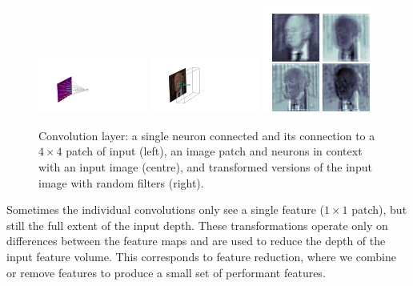\begin{figure}[h!]
    \begin{center}
        \includegraphics[width=0.32\textwidth]{figures/machine_learning/convolution_neuron.pdf}
        \includegraphics[width=0.32\textwidth]{figures/machine_learning/convolution_layer.pdf}
        \includegraphics[width=0.32\textwidth]{figures/machine_learning/convolution_transforms.pdf}
    \end{center}
    \caption{Convolution layer: a single neuron connected and its connection to a $4\times{}4$ patch of input (left), an image patch and neurons in context with an input image \cite{Higgs_photo} (centre), and transformed versions of the input image with random filters (right).}
        \label{fig:machine_learning:convolution}
\end{figure}

Sometimes the individual convolutions only see a single feature ($1\times{}1$ patch), but still the full extent of the input depth. These transformations operate only on differences between the feature maps and are used to reduce the depth of the input feature volume. 
This corresponds to feature reduction, where we combine or remove features to produce a small set of performant features. 



